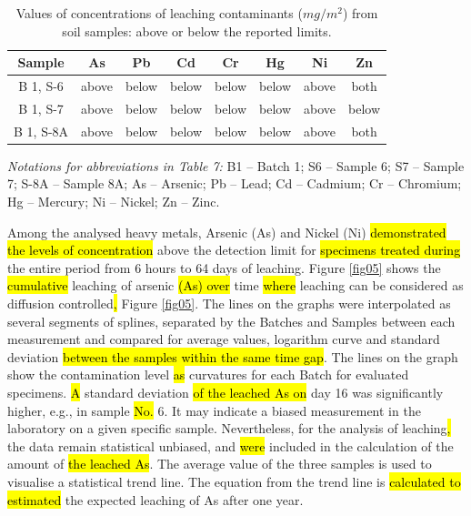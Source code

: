\documentclass[algorithms,article,submit,pdftex,moreauthors]{Definitions/mdpi}
\begin{document}
\begin{table}[H] 
\begin{threeparttable}
\centering
\caption{Values of concentrations of leaching contaminants ($mg/m^2$) from soil samples: above or below the reported limits.\label{tab06}}
\begin{tabularx}{\textwidth}{CCCCCCCC}
\toprule
\textbf{Sample} & \textbf{As} & \textbf{Pb} & \textbf{Cd} & \textbf{Cr} & \textbf{Hg} & \textbf{Ni} & \textbf{Zn} \\
\midrule
B 1, S-6 & above & below & below & below & below & above & both \\
B 1, S-7 & above & below & below & below & below & above & below \\
B 1, S-8A & above & below & below & below & below & above & both \\
\bottomrule
\end{tabularx}
\begin{tablenotes}
      \small
      	\item \emph{Notations for abbreviations in Table 7:}  B1 -- Batch 1; S6 -- Sample 6; S7 -- Sample 7; S-8A -- Sample 8A; As -- Arsenic; Pb -- Lead; Cd -- Cadmium; Cr -- Chromium; Hg -- Mercury; Ni -- Nickel; Zn -- Zinc. 
    \end{tablenotes}
  \end{threeparttable}
\end{table}

Among the analysed heavy metals, Arsenic (As) and Nickel (Ni) \hl{demonstrated the levels of concentration} above the detection limit for \hl{specimens treated during }the entire\hl{ }period from 6 hours to 64 days of leaching. Figure \ref{fig05} shows the \hl{cumulative} leaching of arsenic \hl{(As) over} time \hl{where} leaching\hl{ }can be considered as diffusion controlled\hl{, }Figure \ref{fig05}. The lines on the graphs were\hl{ }interpolated as several\hl{ }segments of splines, separated by the Batches and Samples\hl{ }between each measurement and compared for average values, logarithm curve and standard deviation \hl{between the samples within the same time gap}. The\hl{ }lines on the graph show\hl{ }the contamination level\hl{ as }curvatures\hl{ }for each Batch for\hl{ }evaluated specimens. \hl{A }standard deviation \hl{of the leached As on} day 16\hl{ }was significantly higher,\hl{ }e.g., in sample \hl{No.} 6. It may indicate a biased measurement in the laboratory on a given specific sample. Nevertheless, for the analysis of leaching\hl{, }the data remain statistical unbiased, and \hl{were} included in the calculation of the amount of \hl{the leached As}. The average value of the three samples is used to visualise a statistical trend line. The equation from the trend line is \hl{calculated to estimated} the expected leaching of As after one year. 
\end{document}
